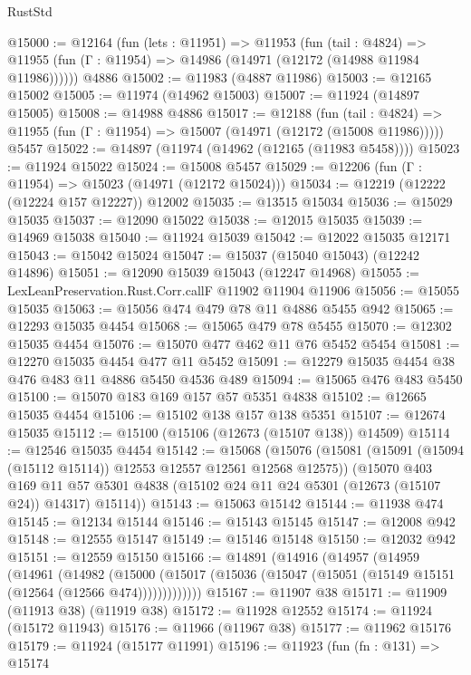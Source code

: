 \begin{lexlean}{RustStd}
\begin{coremodule}
{\begin{coremodule}
{{{{{{{{{{{{{{{{{{{{{{{{{{{{{{{{{{{{{{{{{{{{{{{{{{{{{{{{{{{{{{{{{{{{{{{{{{{{{{{{@15000 := @12164
    (fun (lets : @11951) =>
    @11953
      (fun (tail : @4824) =>
      @11955 (fun (Γ : @11954) => @14986 (@14971 (@12172 (@14988 @11984 @11986))))))
    @4886
@15002 := @11983 (@4887 @11986)
@15003 := @12165 @15002
@15005 := @11974 (@14962 @15003)
@15007 := @11924 (@14897 @15005)
@15008 := @14988 @4886
@15017 := @12188
    (fun (tail : @4824) => @11955 (fun (Γ : @11954) => @15007 (@14971 (@12172 (@15008 @11986)))))
    @5457
@15022 := @14897 (@11974 (@14962 (@12165 (@11983 @5458))))
@15023 := @11924 @15022
@15024 := @15008 @5457
@15029 := @12206 (fun (Γ : @11954) => @15023 (@14971 (@12172 @15024)))
@15034 := @12219 (@12222 (@12224 @157 @12227)) @12002
@15035 := @13515 @15034
@15036 := @15029 @15035
@15037 := @12090 @15022
@15038 := @12015 @15035
@15039 := @14969 @15038
@15040 := @11924 @15039
@15042 := @12022 @15035 @12171
@15043 := @15042 @15024
@15047 := @15037 (@15040 @15043) (@12242 @14896)
@15051 := @12090 @15039 @15043 (@12247 @14968)
@15055 := LexLeanPreservation.Rust.Corr.callF @11902 @11904 @11906
@15056 := @15055 @15035
@15063 := @15056 @474 @479 @78 @11 @4886 @5455 @942
@15065 := @12293 @15035 @4454
@15068 := @15065 @479 @78 @5455
@15070 := @12302 @15035 @4454
@15076 := @15070 @477 @462 @11 @76 @5452 @5454
@15081 := @12270 @15035 @4454 @477 @11 @5452
@15091 := @12279 @15035 @4454 @38 @476 @483 @11 @4886 @5450 @4536 @489
@15094 := @15065 @476 @483 @5450
@15100 := @15070 @183 @169 @157 @57 @5351 @4838
@15102 := @12665 @15035 @4454
@15106 := @15102 @138 @157 @138 @5351
@15107 := @12674 @15035
@15112 := @15100 (@15106 (@12673 (@15107 @138)) @14509)
@15114 := @12546 @15035 @4454
@15142 := @15068
    (@15076
      (@15081 (@15091 (@15094 (@15112 @15114)) @12553 @12557 @12561 @12568 @12575))
      (@15070
        @403
        @169
        @11
        @57
        @5301
        @4838
        (@15102 @24 @11 @24 @5301 (@12673 (@15107 @24)) @14317)
        @15114))
@15143 := @15063 @15142
@15144 := @11938 @474
@15145 := @12134 @15144
@15146 := @15143 @15145
@15147 := @12008 @942
@15148 := @12555 @15147
@15149 := @15146 @15148
@15150 := @12032 @942
@15151 := @12559 @15150
@15166 := @14891
    (@14916
      (@14957
        (@14959
          (@14961
            (@14982
              (@15000
                (@15017 (@15036 (@15047 (@15051 (@15149 @15151 (@12564 (@12566 @474)))))))))))))
@15167 := @11907 @38
@15171 := @11909 (@11913 @38) (@11919 @38)
@15172 := @11928 @12552
@15174 := @11924 (@15172 @11943)
@15176 := @11966 (@11967 @38)
@15177 := @11962 @15176
@15179 := @11924 (@15177 @11991)
@15196 := @11923
    (fun (fn : @131) =>
    @15174
}}}}}}}}}}}}}}}}}}}}}}}}}}}}}}}}}}}}}}}}}}}}}}}}}}}}}}}}}}}}}}}}}}}}}}}}}}}}}}}}
\end{coremodule}}
\end{coremodule}
\end{lexlean}
